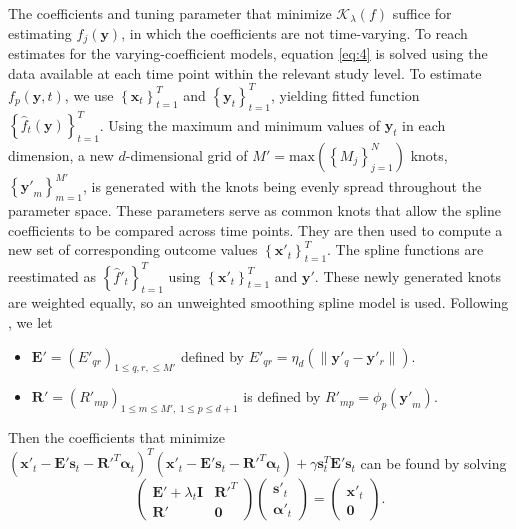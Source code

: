 \documentclass[11pt,reqno]{article}
\theoremstyle{definition}
\begin{document}
The coefficients and tuning parameter that minimize $\mathcal{K}_{\lambda}(f)$ suffice for estimating $f_{j}(\mathbf{y})$, in which the coefficients are not time-varying. To reach estimates for the varying-coefficient models, equation \ref{eq:4} is solved using the data available at each time point within the relevant study level. To estimate $f_p(\mathbf{y}, t)$, we use $\left\{\mathbf{x}_t\right\}_{t=1}^T$ and $\left\{\mathbf{y}_t\right\}_{t=1}^T$, yielding fitted function $\left\{\hat{f}_t(\mathbf{y})\right\}_{t=1}^T$. Using the maximum and minimum values of $\mathbf{y}_t$ in each dimension, a new $d$-dimensional grid of $M' = \text{max}\left(\left\{M_{j}\right\}_{j = 1}^{N}\right)$ knots, $\left\{\mathbf{y'}_m\right\}_{m=1}^{M'}$, is generated with the knots being evenly spread throughout the parameter space. These parameters serve as common knots that allow the spline coefficients to be compared across time points. They are then used to compute a new set of corresponding outcome values $\left\{\mathbf{x}'_t\right\}_{t=1}^{T}$. The spline functions are reestimated as $\left\{\hat{f}'_t\right\}_{t=1}^{T}$ using $\left\{\mathbf{x}'_t\right\}_{t=1}^{T}$ and $\mathbf{y}'$. These newly generated knots are weighted equally, so an unweighted smoothing spline model is used. Following \cite{greenSilverman1994}, we let

\begin{itemize}
  \item $\mathbf{E}' = \left(E'_{qr}\right)_{1 \leq q, r, \leq M'}$ defined by $E'_{qr} = \eta_{d}\left(\|\mathbf{y}'_{q} - \mathbf{y}'_{r}\|\right)$.
  \item $\mathbf{R}' = \left(R'_{mp}\right)_{1 \leq m \leq M', \ 1 \leq p \leq d + 1}$ is defined by $R'_{mp} = \phi_p(\mathbf{y'}_{m})$.
\end{itemize}

Then the coefficients that minimize $\left(\mathbf{x}'_t - \mathbf{E}'\mathbf{s}_t - \mathbf{R}'^{T}\mathbf{\alpha}_t\right)^{T}\left(\mathbf{x}'_t - \mathbf{E}'\mathbf{s}_t - \mathbf{R}'^{T}\mathbf{\alpha}_t\right) + \gamma\mathbf{s}_t^{T}\mathbf{E}'\mathbf{s}_t$ can be found by solving 
\begin{equation}
  \left(
  \begin{array}{cc}
    \mathbf{E}' + \lambda_{t}\mathbf{I} & \mathbf{R}'^{T} \\
    \mathbf{R}' & \mathbf{0}
  \end{array}
  \right)\left(
  \begin{array}{c}
    \mathbf{s}'_t \\
    \mathbf{\alpha}'_t
  \end{array}
  \right) = \left(
  \begin{array}{c}
    \mathbf{x}'_t \\
    \mathbf{0}
  \end{array}
  \right). \label{eq:6}
\end{equation}
\end{document}

